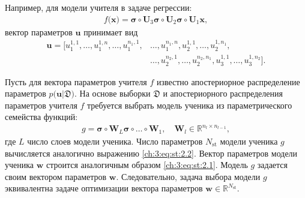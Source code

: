 \documentclass{dissert}
\begin{document}
Например, для модели учителя в задаче регрессии:
\[
\label{ch:3:eq:st:3}
\begin{aligned}
f\bigr(\mathbf{x}\bigr) = \bm{\sigma} \circ \mathbf{U}_3 \bm{\sigma} \circ \mathbf{U}_2\bm{\sigma}\circ \mathbf{U}_1\mathbf{x},
\end{aligned}
\]
вектор параметров $\mathbf{u}$ принимает вид
\[
\label{ch:3:eq:st:4}
\begin{aligned}
\mathbf{u} = \bigr[u_1^{1,1}, \ldots, u_1^{1,n},
                                               \ldots, 
                             u_1^{n_1,1}, &\ldots, u_1^{n_1,n},  
                             u_2^{1, 1}, \ldots, u_2^{1, n_1}, \\
                                                & \ldots, 
                            u_2^{n_2, 1}, \ldots, u_2^{n_2, n_1},
                            u_3^{1, 1}, \ldots, u_3^{1, n_2}\bigr].
\end{aligned}
\]

Пусть для вектора параметров учителя $f$ известно апостериорное распределение параметров $p\bigr(\mathbf{u}|\mathfrak{D}\bigr)$. 
На основе выборки $\mathfrak{D}$ и апостериорного распределения параметров учителя $f$ требуется выбрать модель ученика из параметрического семейства функций:
\[
\label{ch:3:eq:st:5}
\begin{aligned}
g = \bm{\sigma} \circ \mathbf{W}_L\bm{\sigma}  \circ \ldots \circ \mathbf{W}_1, \quad \mathbf{W}_l \in \mathbb{R}^{n_l \times n_{l-1}},
\end{aligned}
\]
где $L$ число слоев модели ученика.
Число параметров $N_{\text{st}}$ модели ученика $g$ вычисляется аналогично выражению \eqref{ch:3:eq:st:2.2}.
Вектор параметров модели ученика $\mathbf{w}$ строится аналогичным образом \eqref{ch:3:eq:st:2.1}.
Модель $g$ задается своим вектором параметров $\mathbf{w}$.
Следовательно, задача выбора модели $g$ эквивалентна задаче оптимизации вектора параметров $\mathbf{w}\in\mathbb{R}^{N_{\text{st}}}$.
\end{document}
